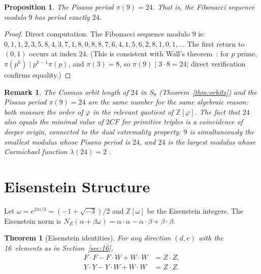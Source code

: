 \documentclass[11pt]{article}
\newtheorem{proposition}[definition]{Proposition}
\newtheorem{theorem}[definition]{Theorem}
\newtheorem{remark}[definition]{Remark}
\newcommand{\Zphi}{\mathbb{Z}[\varphi]}
\begin{document}
\begin{proposition}
The Pisano period $\pi(9) = 24$.  That is, the Fibonacci sequence modulo $9$ has period exactly $24$.
\end{proposition}

\begin{proof}
Direct computation.  The Fibonacci sequence modulo $9$ is:
$0, 1, 1, 2, 3, 5, 8, 4, 3, 7, 1, 8, 0, 8, 8, 7, 6, 4, 1, 5, 6, 2, 8, 1, 0, 1, \dots$
The first return to $(0,1)$ occurs at index $24$.  (This is consistent with Wall's theorem~\cite{wall1960}: for $p$ prime, $\pi(p^k) \mid p^{k-1}\pi(p)$, and $\pi(3) = 8$, so $\pi(9) \mid 3 \cdot 8 = 24$; direct verification confirms equality.)
\end{proof}

\begin{remark}
The Cosmos orbit length of $24$ in $S_9$ (Theorem~\ref{thm:orbits}) and the Pisano period $\pi(9) = 24$ are the same number for the same algebraic reason: both measure the order of $\varphi$ in the relevant quotient of $\Zphi$.  The fact that $24$ also equals the minimal value of $2CF$ for primitive triples is a coincidence of deeper origin, connected to the dual extremality property: $9$ is simultaneously the smallest modulus whose Pisano period is $24$, and $24$ is the largest modulus whose Carmichael function $\lambda(24) = 2$ \cite{wall1960,carmichael1910}.
\end{remark}

\section{Eisenstein Structure}\label{sec:eisenstein}

Let $\omega = e^{2\pi i/3} = (-1+\sqrt{-3})/2$ and $\mathbb{Z}[\omega]$ be the Eisenstein integers.  The Eisenstein norm is $N_E(\alpha + \beta\omega) = \alpha\cdot\alpha - \alpha\cdot\beta + \beta\cdot\beta$.

\begin{theorem}[Eisenstein identities]\label{thm:eisenstein}
For any direction $(d,e)$ with the 16~elements as in Section~\ref{sec:16},
\begin{align}
  F\cdot F - F\cdot W + W\cdot W &= Z\cdot Z, \label{eq:eis1}\\
  Y\cdot Y - Y\cdot W + W\cdot W &= Z\cdot Z. \label{eq:eis2}
\end{align}
\end{theorem}
\end{document}
